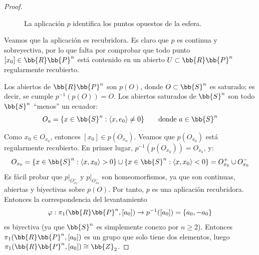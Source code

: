 \begin{coro}
\begin{proof}
\begin{figure}[ht]
            \caption{La aplicación $p$ identifica los puntos opuestos de la esfera.}
        \end{figure}

        Veamos que la aplicación
        es recubridora. Es claro que $p$ es continua y sobreyectiva, por lo que falta por comprobar que todo punto $[x_0]\in \bb{R}\bb{P}^n$ está contenido en un abierto $U\subset \bb{R}\bb{P}^n$ regularmente recubierto.

        Los abiertos de $\bb{R}\bb{P}^n$ son $p(O)$, donde $O\subset \bb{S}^n$ es saturado; es decir, se cumple $p^{-1}(p(O))=O$. Los abiertos saturados de $\bb{S}^n$ son todo $\bb{S}^n$ ``menos'' un ecuador:
        \begin{equation*}
            O_{a}=\{x\in \bb{S}^n : \langle x, e_0 \rangle \neq 0\}\qquad \text{donde } a\in \bb{S}^n
        \end{equation*}
        

        Como $x_0\in O_{x_0}$, entonces $[x_0]\in p(O_{x_0})$. Veamos que $p(O_{x_0})$ está regularmente recubierto. En primer lugar, $p^{-1}(p(O_{x_0}))=O_{x_0}$, y:
        \begin{gather*}
            O_{x_0} = \{x\in \bb{S}^n : \langle x, x_0 \rangle > 0\} \cup \{x\in \bb{S}^n : \langle x, x_0 \rangle < 0\} = O_{x_0}^+ \cup O_{x_0}^-
        \end{gather*}
        Es fácil probar que $p|_{O_{x_0}^+}$ y $p|_{O_{x_0}^-}$ son homeomorfismos, ya que son continuas, abiertas y biyectivas sobre $p(O)$. Por tanto, $p$ es una aplicación recubridora.  Entonces la correspondencia del levantamiento
        \begin{gather*}
            \varphi: \pi_1(\bb{R}\bb{P}^n, [a_0]) \to p^{-1}([a_0]) = \{a_0,-a_0\}
        \end{gather*}
        es biyectiva (ya que $\bb{S}^n$ es simplemente conexo por $n\geq 2$). Entonces $\pi_1(\bb{R}\bb{P}^n, [a_0])$ es un grupo que solo tiene dos elementos, luego $\pi_1(\bb{R}\bb{P}^n, [a_0]) \cong \bb{Z}_2$.
    \end{proof}

\end{coro}

